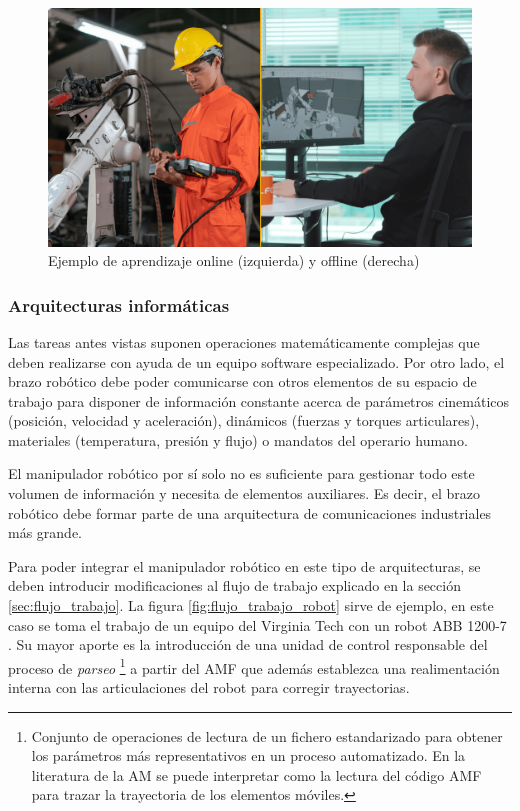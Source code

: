 \begin{figure}[h!]
    \centering
    \includegraphics[scale=0.15]{figuras/aprendizaje_online_offline.png}
    \caption{Ejemplo de aprendizaje online (izquierda) y offline (derecha)}
    \label{fig:aprendizaje_online_offline}
\end{figure}

\subsubsection*{Arquitecturas informáticas}
\hypertarget{Arquitecturas informáticas}{}
\label{sec: arquitecturas_informaticas_estado_arte}

Las tareas antes vistas suponen operaciones matemáticamente complejas que deben realizarse con ayuda de un equipo software especializado. Por otro lado, el brazo robótico debe poder comunicarse con otros elementos de su espacio de trabajo para disponer de información constante acerca de parámetros cinemáticos (posición, velocidad y aceleración), dinámicos (fuerzas y torques articulares), materiales (temperatura, presión y flujo) o mandatos del operario humano. 

El manipulador robótico por sí solo no es suficiente para gestionar todo este volumen de información y necesita de elementos auxiliares. Es decir, el brazo robótico debe formar parte de una arquitectura de comunicaciones industriales más grande.

Para poder integrar el manipulador robótico en este tipo de arquitecturas, se deben introducir modificaciones al flujo de trabajo explicado en la sección \ref{sec:flujo_trabajo}. La figura \ref{fig:flujo_trabajo_robot} sirve de ejemplo, en este caso se toma el trabajo de un equipo del Virginia Tech con un robot ABB  1200-7 \cite{Kubalak2016}. Su mayor aporte es la introducción de una unidad de control responsable del proceso de \textit{parseo} \footnote{Conjunto de operaciones de lectura de un fichero estandarizado para obtener los parámetros más representativos en un proceso automatizado. En la literatura de la \acrshort{AM} se puede interpretar como la lectura del código \acrshort{AMF} para trazar la trayectoria de los elementos móviles.} a partir del \acrshort{AMF} que además establezca una realimentación interna con las articulaciones del robot para corregir trayectorias.

